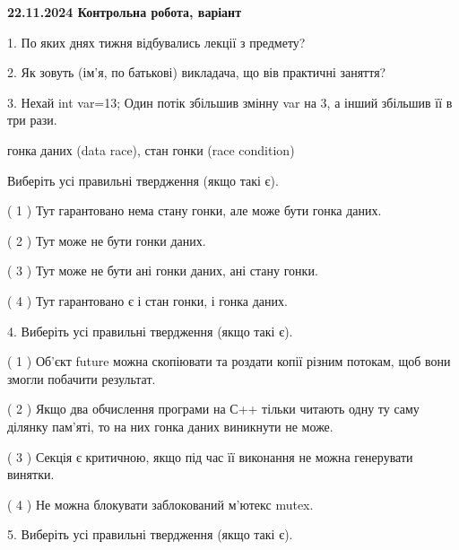 \documentclass[12pt, ukrainian]{article}
\begin{document}
\vspace{4mm}
\newpage
\begin {large}

\textbf{22.11.2024 Контрольна робота, варіант  }\par


{
1. По яких днях тижня відбувались лекції з предмету?



\vspace{5mm}
2. Як зовуть (ім'я, по батькові) викладача, що вів практичні заняття?



\vspace{5mm}
3. Нехай int var=13; Один потік збільшив змінну var на 3, а інший збільшив її в три рази.

гонка даних (data race), стан гонки (race condition)

Виберіть усі правильні твердження (якщо такі є).\par
\vspace{2mm}
( 1 ) Тут гарантовано нема стану гонки, але може бути гонка даних.%

( 2 ) Тут може не бути гонки даних.%

( 3 ) Тут може не бути ані гонки даних, ані стану гонки.%

( 4 ) Тут гарантовано є і стан гонки, і гонка даних.%


\vspace{5mm}
4. Виберіть усі правильні твердження (якщо такі є).\par
\vspace{2mm}

( 1 ) Об’єкт future можна скопіювати та роздати копії різним потокам, щоб вони змогли побачити результат.%

( 2 ) Якщо два обчислення програми на С++ тільки читають одну ту саму ділянку пам'яті, то на них гонка даних  виникнути не може.%

( 3 ) Секція є критичною, якщо під час її виконання не можна генерувати винятки.%

( 4 ) Не можна блокувати заблокований м’ютекс mutex.%


\vspace{5mm}
5. Виберіть усі правильні твердження (якщо такі є).\par
\vspace{2mm}

}
\end{large}
\end{document}
